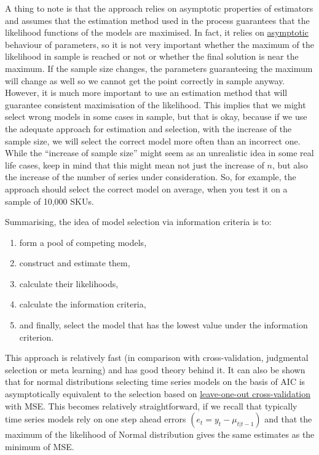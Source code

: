 \documentclass[
]{book}
\providecommand{\tightlist}{%
  \setlength{\itemsep}{0pt}\setlength{\parskip}{0pt}}
\theoremstyle{definition}
\theoremstyle{definition}
\theoremstyle{definition}
\theoremstyle{definition}
\theoremstyle{remark}
\begin{document}
A thing to note is that the approach relies on asymptotic properties of estimators and assumes that the estimation method used in the process guarantees that the likelihood functions of the models are maximised. In fact, it relies on \protect\hyperlink{likelihoodApproach}{asymptotic} behaviour of parameters, so it is not very important whether the maximum of the likelihood in sample is reached or not or whether the final solution is near the maximum. If the sample size changes, the parameters guaranteeing the maximum will change as well so we cannot get the point correctly in sample anyway. However, it is much more important to use an estimation method that will guarantee consistent maximisation of the likelihood. This implies that we might select wrong models in some cases in sample, but that is okay, because if we use the adequate approach for estimation and selection, with the increase of the sample size, we will select the correct model more often than an incorrect one. While the ``increase of sample size'' might seem as an unrealistic idea in some real life cases, keep in mind that this might mean not just the increase of \(n\), but also the increase of the number of series under consideration. So, for example, the approach should select the correct model on average, when you test it on a sample of 10,000 SKUs.

Summarising, the idea of model selection via information criteria is to:

\begin{enumerate}
\def\labelenumi{\arabic{enumi}.}
\tightlist
\item
  form a pool of competing models,
\item
  construct and estimate them,
\item
  calculate their likelihoods,
\item
  calculate the information criteria,
\item
  and finally, select the model that has the lowest value under the information criterion.
\end{enumerate}

This approach is relatively fast (in comparison with cross-validation, judgmental selection or meta learning) and has good theory behind it. It can also be shown that for normal distributions selecting time series models on the basis of AIC is asymptotically equivalent to the selection based on \href{https://en.wikipedia.org/wiki/Cross-validation_(statistics)\#Leave-one-out_cross-validation}{leave-one-out cross-validation} with MSE. This becomes relatively straightforward, if we recall that typically time series models rely on one step ahead errors \((e_t = y_t - \mu_{t|t-1})\) and that the maximum of the likelihood of Normal distribution gives the same estimates as the minimum of MSE.
\end{document}
